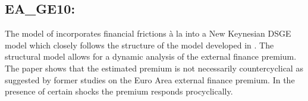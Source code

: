 \documentclass[11pt,a4paper]{article}
\begin{document}
	
	\subsection{EA\_GE10: \cite{Gelain2010}}
	\label{EAGE10}
	The model of \cite{Gelain2010} incorporates financial frictions \`{a} la \cite{BernankeGertlerGilchrist1999} into a New Keynesian DSGE model which closely follows the structure of the model developed in \cite{SmetsWouters2003}. The structural model allows for a dynamic analysis of the external finance premium. The paper shows that the estimated premium is not necessarily countercyclical as suggested by former studies on the Euro Area external finance premium. In the presence of certain shocks the premium responds procyclically.
	
\end{document}

